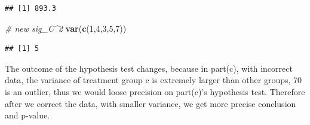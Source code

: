 \documentclass[
]{article}
\newenvironment{Shaded}{\begin{snugshade}}{\end{snugshade}}
\newcommand{\CommentTok}[1]{\textcolor[rgb]{0.56,0.35,0.01}{\textit{#1}}}
\newcommand{\DecValTok}[1]{\textcolor[rgb]{0.00,0.00,0.81}{#1}}
\newcommand{\KeywordTok}[1]{\textcolor[rgb]{0.13,0.29,0.53}{\textbf{#1}}}
\newcommand{\NormalTok}[1]{#1}
\begin{document}
\begin{verbatim}
## [1] 893.3
\end{verbatim}

\begin{Shaded}
\begin{Highlighting}[]
\CommentTok{# new sig_C^2}
\KeywordTok{var}\NormalTok{(}\KeywordTok{c}\NormalTok{(}\DecValTok{1}\NormalTok{,}\DecValTok{4}\NormalTok{,}\DecValTok{3}\NormalTok{,}\DecValTok{5}\NormalTok{,}\DecValTok{7}\NormalTok{))}
\end{Highlighting}
\end{Shaded}

\begin{verbatim}
## [1] 5
\end{verbatim}

The outcome of the hypothesis test changes, because in part(c), with
incorrect data, the variance of treatment group c is extremely larger
than other groups, 70 is an outlier, thus we would loose precision on
part(c)'s hypothesis test. Therefore after we correct the data, with
smaller variance, we get more precise conclusion and p-value.
\end{document}
